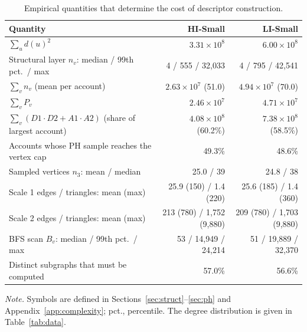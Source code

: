 \begin{table}[htbp]
\centering
\footnotesize
\caption{Empirical quantities that determine the cost of descriptor construction.}
\label{tab:complexity}
\begin{threeparttable}
\begin{tabular}{lrr}
\toprule
Quantity & HI-Small & LI-Small \\
\midrule
$\sum_u d(u)^2$ & $3.31\times10^{8}$ & $6.00\times10^{8}$ \\
Structural layer $n_v$: median / 99th pct.\ / max & 4 / 555 / 32,033 & 4 / 795 / 42,541 \\
$\sum_v n_v$ (mean per account) & $2.63\times10^{7}$ (51.0) & $4.94\times10^{7}$ (70.0) \\
$\sum_v P_v$ & $2.46\times10^{7}$ & $4.71\times10^{7}$ \\
$\sum_v(D1\cdot D2+A1\cdot A2)$ (share of largest account) & $4.08\times10^{8}$ (60.2\%) & $7.38\times10^{8}$ (58.5\%) \\
Accounts whose PH sample reaches the vertex cap & 49.3\% & 48.6\% \\
Sampled vertices $n_3$: mean / median & 25.0 / 39 & 24.8 / 38 \\
Scale 1 edges / triangles: mean (max) & 25.9 (150) / 1.4 (220) & 25.6 (185) / 1.4 (360) \\
Scale 2 edges / triangles: mean (max) & 213 (780) / 1,752 (9,880) & 209 (780) / 1,703 (9,880) \\
BFS scan $B_v$: median / 99th pct.\ / max & 53 / 14,949 / 24,214 & 51 / 19,889 / 32,370 \\
Distinct subgraphs that must be computed & 57.0\% & 56.6\% \\
\bottomrule
\end{tabular}
\begin{tablenotes}[flushleft]
\footnotesize
\setlength{\labelsep}{0pt}\item[] \textit{Note.} Symbols are defined in Sections~\ref{sec:struct}--\ref{sec:ph} and Appendix~\ref{app:complexity}; pct., percentile. The degree distribution is given in Table~\ref{tab:data}.
\end{tablenotes}
\end{threeparttable}
\end{table}
